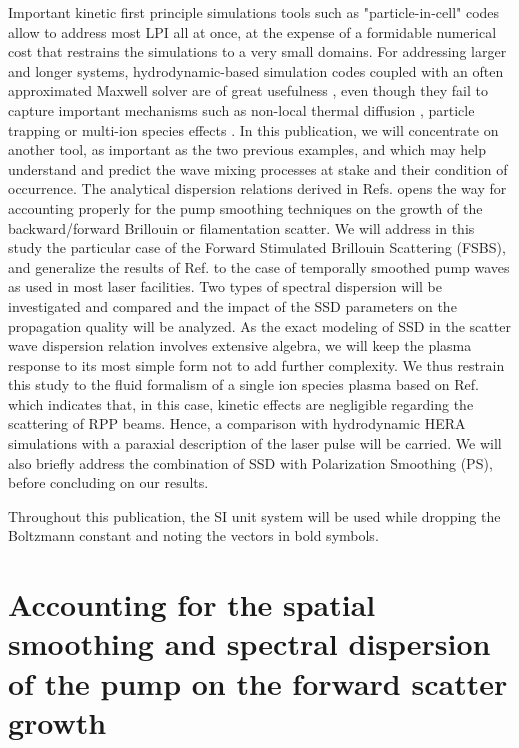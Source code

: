 \documentclass[
 reprint,
 amsmath,amssymb,
 aps,
]{revtex4-1}
\begin{document}
Important kinetic first principle simulations tools such as "particle-in-cell" codes  \cite[]{Lefebvre_2003,fonseca_osiris,Smilei}  allow  to address most LPI all at once, at the expense of a formidable numerical cost that restrains the simulations to a very small domains. For addressing  larger and longer systems,  hydrodynamic-based simulation codes coupled with an often approximated Maxwell solver are of great usefulness \cite{Berger_1995,Still_2006,Loiseau_2006, Huller_2006}, even though they fail to capture important mechanisms  such as non-local thermal diffusion \cite[]{POP_Schurtz_2000,PRL_Froula_2007},
particle trapping   \cite[]{POP_Benisti_2008,POP_Berger_2013} or multi-ion species effects \cite[]{POP_Williams_95,Abramowitz,POP_Berger_2005b,Ruyer_2020}.
In this publication, we will concentrate on another tool,  as important as the two previous examples, and which may help understand and predict the wave mixing processes at stake and their condition of occurrence. The analytical dispersion relations derived in Refs.  \cite[]{POP_Ruyer_2021,Arxiv_brandao_2021} opens the way for accounting properly for the pump smoothing techniques on the growth of the backward/forward Brillouin or filamentation scatter. 
We will address in this study the particular case of the Forward Stimulated  Brillouin Scattering (FSBS), and generalize the results of Ref.  \cite[]{POP_Ruyer_2021} to the case of temporally smoothed pump waves as used in most laser facilities. Two types of spectral dispersion will be investigated and compared and the impact of the SSD parameters on the propagation quality will be analyzed. 
As the exact modeling of SSD in the scatter wave dispersion relation involves extensive algebra, we will keep the plasma response to its most simple form not to add further complexity. We thus restrain this study to the fluid formalism of a single ion species plasma based on   Ref.  \cite[]{POP_Ruyer_2021}  which indicates that, in this case, kinetic effects are negligible regarding the scattering of  RPP beams.
Hence, a comparison with hydrodynamic HERA simulations with a paraxial description of the  laser pulse will be carried.
We will also briefly address the combination of SSD with Polarization Smoothing (PS),
before concluding on our results.

Throughout this publication, the SI unit system will be used while dropping the Boltzmann constant and noting the vectors in bold symbols.


\section{Accounting for the spatial smoothing and spectral dispersion of the pump on the forward scatter growth}
\end{document}

